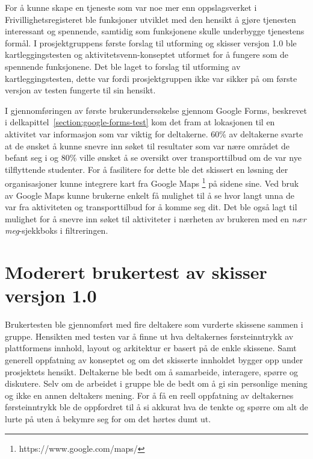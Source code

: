 For å kunne skape en tjeneste som var noe mer enn oppslagsverket i Frivillighetsregisteret ble funksjoner utviklet med den hensikt å gjøre tjenesten interessant og spennende, samtidig som funksjonene skulle underbygge tjenestens formål. I prosjektgruppens første forslag til utforming og skisser versjon 1.0 ble kartleggingstesten og aktivitetsvenn-konseptet utformet for å fungere som de spennende funksjonene. Det ble laget to forslag til utforming av kartleggingstesten, dette var fordi prosjektgruppen ikke var sikker på om første versjon av testen fungerte til sin hensikt.

I gjennomføringen av første brukerundersøkelse gjennom Google Forms, beskrevet i delkapittel~\ref{section:google-forms-test} kom det fram at lokasjonen til en aktivitet var informasjon som var viktig for deltakerne. 60\% av deltakerne svarte at de ønsket å kunne snevre inn søket til resultater som var nære området de befant seg i og 80\% ville ønsket å se oversikt over transporttilbud om de var nye tilflyttende studenter. For å fasilitere for dette ble det skissert en løsning der organisasjoner kunne integrere kart fra Google Maps \footnote{https://www.google.com/maps/} på sidene sine. Ved bruk av Google Maps kunne brukerne enkelt få mulighet til å se hvor langt unna de var fra aktiviteten og transporttilbud for å komme seg dit. Det ble også lagt til mulighet for å snevre inn søket til aktiviteter i nærheten av brukeren med en {\em nær meg}-sjekkboks i filtreringen.


\section{Moderert brukertest av skisser versjon 1.0}
\label{section:Moderert brukertest-skisser-1}

Brukertesten ble gjennomført med fire deltakere som vurderte skissene sammen i gruppe. Hensikten med testen var å finne ut hva deltakernes førsteinntrykk av plattformens innhold, layout og arkitektur er basert på de enkle skissene. Samt generell oppfatning av konseptet og om det skisserte innholdet bygger opp under prosjektets hensikt. Deltakerne ble bedt om å samarbeide, interagere, spørre og diskutere. Selv om de arbeidet i gruppe ble de bedt om å gi sin personlige mening og ikke  en annen deltakers mening. For å få en reell oppfatning av deltakernes førsteinntrykk ble de oppfordret til å si akkurat hva de tenkte og spørre om alt de lurte på uten å bekymre seg for om det hørtes dumt ut.

